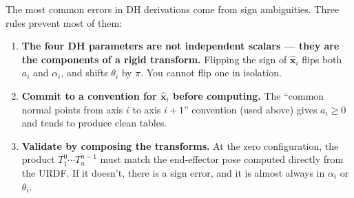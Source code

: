\documentclass[11pt]{article}
\newcommand{\unit}[1]{\hat{\bm{#1}}}
\begin{document}
The most common errors in DH derivations come from sign ambiguities. Three
rules prevent most of them:

\begin{enumerate}
  \item \textbf{The four DH parameters are not independent scalars --- they
    are the components of a rigid transform.} Flipping the sign of
    $\unit{x}_i$ flips both $a_i$ and $\alpha_i$, and shifts $\theta_i$ by
    $\pi$. You cannot flip one in isolation.
  \item \textbf{Commit to a convention for $\unit{x}_i$ before computing.}
    The ``common normal points from axis $i$ to axis $i{+}1$'' convention
    (used above) gives $a_i \ge 0$ and tends to produce clean tables.
  \item \textbf{Validate by composing the transforms.} At the zero
    configuration, the product $T_1^0 \cdots T_n^{n-1}$ must match the
    end-effector pose computed directly from the URDF. If it doesn't, there
    is a sign error, and it is almost always in $\alpha_i$ or $\theta_i$.
\end{enumerate}
\end{document}
